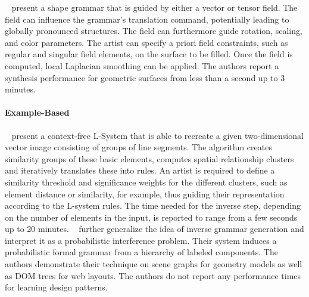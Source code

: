   \citeauthor*{yuanyuan_2011_gso}~\cite{yuanyuan_2011_gso} present a shape grammar that is guided by either a vector or tensor field. The field can influence the grammar's translation command, potentially leading to globally pronounced structures. The field can furthermore guide rotation, scaling, and color parameters. The artist can specify a priori field constraints, such as regular and singular field elements, on the surface to be filled. Once the field is computed, local Laplacian smoothing can be applied. The authors report a synthesis performance for geometric surfaces from less than a second up to 3 minutes. 


\paragraph*{Example-Based}
\label{para:analysis_rulebased_example}

\citeauthor*{stava_2010_ipm}~\cite{stava_2010_ipm} present a context-free L-System that is able to recreate a given two-dimensional vector image consisting of groups of line segments. The algorithm creates similarity groups of these basic elements, computes spatial relationship clusters and iteratively translates these into rules. An artist is required to define a similarity threshold and significance weights for the different clusters, such as element distance or similarity, for example, thus guiding their representation according to the L-system rules. The time needed for the inverse step, depending on the number of elements in the input, is reported to range from a few seconds up to 20 minutes. \citeauthor*{talton_2012_ldp}~\cite{talton_2012_ldp} further generalize the idea of inverse grammar generation and interpret it as a probabilistic interference problem. Their system induces a probabilistic formal grammar from a hierarchy of labeled components. The authors demonstrate their technique on scene graphs for geometry models as well as DOM trees for web layouts. The authors do not report any performance times for learning design patterns.


